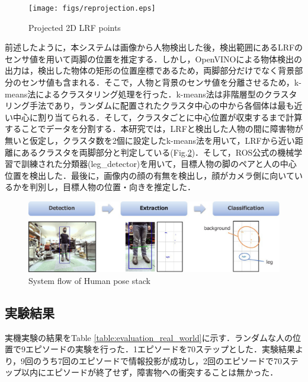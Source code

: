 \documentclass[12pt]{sonota/aislab}
\begin{document}
\begin{figure}[t]
\begin{center}
\texttt{[image: figs/reprojection.eps]}
\caption{Projected 2D LRF points}
\label{reprojection}
\end{center}
\end{figure}

前述したように，本システムは画像から人物検出した後，検出範囲にあるLRFのセンサ値を用いて両脚の位置を推定する．しかし，OpenVINOによる物体検出の出力は，検出した物体の矩形の位置座標であるため，両脚部分だけでなく背景部分のセンサ値も含まれる．そこで，人物と背景のセンサ値を分離させるため，k-means法によるクラスタリング処理を行った．k-means法は非階層型のクラスタリング手法であり，ランダムに配置されたクラスタ中心の中から各個体は最も近い中心に割り当てられる．そして，クラスタごとに中心位置が収束するまで計算することでデータを分割する．本研究では，LRFと検出した人物の間に障害物が無いと仮定し，クラスタ数を2個に設定したk-means法を用いて，LRFから近い距離にあるクラスタを両脚部分と判定している(Fig.\ref{human_lidar_flow})．そして，ROS公式の機械学習で訓練された分類器(leg\_detector)を用いて，目標人物の脚のペアと人の中心位置を検出した．最後に，画像内の顔の有無を検出し，顔がカメラ側に向いているかを判別し，目標人物の位置・向きを推定した．

\begin{figure}[t]
\begin{center}
\includegraphics[clip, width=13cm]{figs/human_lidar_flow.eps}
\caption{System flow of Human pose stack}
\label{human_lidar_flow}
\end{center}
\end{figure}

\subsection{実験結果}
実機実験の結果をTable \ref{table:evaluation_real_world}に示す．ランダムな人の位置で9エピソードの実験を行った．1エピソードを70ステップとした．実験結果より，9回のうち7回のエピソードで情報投影が成功し，2回のエピソードで70ステップ以内にエピソードが終了せず，障害物への衝突することは無かった．
\end{document}
